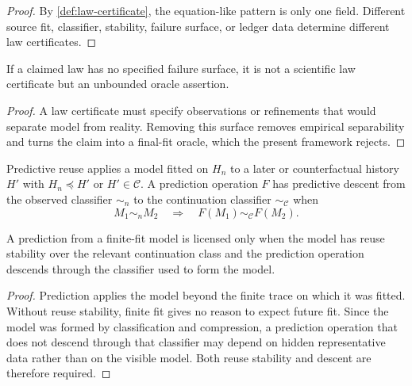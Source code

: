 \begin{proof}
By \autoref{def:law-certificate}, the equation-like pattern is only one field. Different source fit, classifier, stability, failure surface, or ledger data determine different law certificates.
\end{proof}

\begin{corollary}
\label{cor:law-without-failure-surface-oracle}
If a claimed law has no specified failure surface, it is not a scientific law certificate but an unbounded oracle assertion.
\end{corollary}

\begin{proof}
A law certificate must specify observations or refinements that would separate model from reality. Removing this surface removes empirical separability and turns the claim into a final-fit oracle, which the present framework rejects.
\end{proof}

\begin{definition}
\label{def:predictive-reuse-descent}
Predictive reuse applies a model fitted on $H_n$ to a later or counterfactual history $H'$ with $H_n\preceq H'$ or $H'\in\mathcal C$. A prediction operation $F$ has predictive descent from the observed classifier $\sim_n$ to the continuation classifier $\sim_{\mathcal C}$ when
$$
M_1\sim_n M_2
\quad\Longrightarrow\quad
F(M_1)\sim_{\mathcal C}F(M_2).
$$
\end{definition}

\begin{theorem}
\label{thm:prediction-requires-reuse-stability-descent}
A prediction from a finite-fit model is licensed only when the model has reuse stability over the relevant continuation class and the prediction operation descends through the classifier used to form the model.
\end{theorem}

\begin{proof}
Prediction applies the model beyond the finite trace on which it was fitted. Without reuse stability, finite fit gives no reason to expect future fit. Since the model was formed by classification and compression, a prediction operation that does not descend through that classifier may depend on hidden representative data rather than on the visible model. Both reuse stability and descent are therefore required.
\end{proof}

